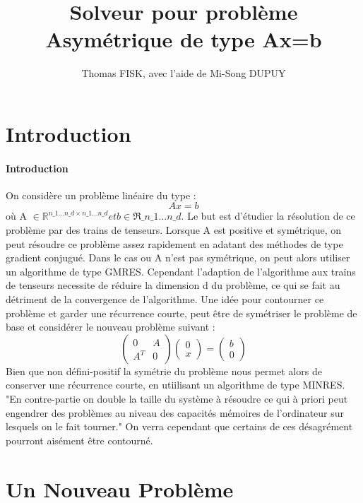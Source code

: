 \documentclass[12 pt]{article}
\title{Solveur pour problème Asymétrique de type Ax=b}
\author{Thomas FISK, avec l'aide de Mi-Song DUPUY}
\begin{document}
\maketitle
\newtheorem*{theorem}{Théorème}

\section{Introduction}

\paragraph*{Introduction}{}
On considère un problème linéaire du type :
  \[ Ax =b \]
où A $\in \mathbb{R}^{n\_1...n\_d \times n\_1...n\_d} et b \in \Re\_{n\_1...n\_d}.$ Le but est d'étudier la résolution de ce problème par des trains de tenseurs.
Lorsque A est positive et symétrique, on peut résoudre ce problème assez rapidement en adatant des méthodes de type gradient conjugué. 
Dans le cas ou A n'est pas symétrique, on peut alors utiliser un algorithme de type GMRES. Cependant l'adaption de l'algorithme aux trains de tenseurs necessite de réduire la dimension d du problème, ce qui se fait au détriment de la convergence de l'algorithme.
Une idée pour contourner ce problème et garder une récurrence courte, peut être de symétriser le problème de base et considérer le nouveau problème suivant :
   \[\begin{pmatrix}
    0 & A \\
    A^{T} & 0 
   \end{pmatrix}
   \begin{pmatrix}
    0 \\ x 
   \end{pmatrix}
   = 
   \begin{pmatrix}
    b \\ 0 
   \end{pmatrix}
   \]
Bien que non défini-positif la symétrie du problème nous permet alors de conserver une récurrence courte, en utiilisant un algorithme de type MINRES. "En contre-partie on double la taille du système à résoudre ce qui à priori peut engendrer des problèmes au niveau des capacités mémoires de l'ordinateur sur lesquels on le fait tourner."
On verra cependant que certains de ces désagrément pourront aisément être contourné. 

\section{Un Nouveau Problème}
\end{document}
